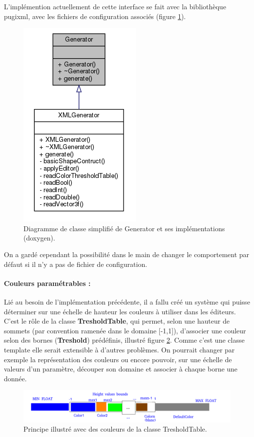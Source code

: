 \documentclass[a4paper]{article}
\begin{document}
L'implémention actuellement de cette interface se fait avec la bibliothèque pugixml, avec les fichiers de configuration associés (figure \ref{archi_generator}).
    \begin{figure}[!ht]
        \begin{center} \includegraphics[width=0.3\linewidth]{img/archi/archi_generator.png}\end{center}
        \caption{\label{archi_generator}Diagramme de classe simplifié de Generator et ses implémentations (doxygen).}
    \end{figure}
    
On a gardé cependant la possibilité dans le main de changer le comportement par défaut si il n'y a pas de fichier de configuration.

\paragraph{Couleurs paramétrables :}

Lié au besoin de l'implémentation précédente, il a fallu créé un système qui puisse déterminer sur une échelle de hauteur les couleurs à utiliser dans les éditeurs. C'est le rôle de la classe \textbf{TresholdTable}, qui permet, selon une hauteur de sommets (par convention ramenée dans le domaine [-1,1]), d'associer une couleur selon des bornes (\textbf{Treshold}) prédéfinis, illustré figure \ref{archi_treshold}. Comme c'est une classe template elle serait extensible à d'autres problèmes. On pourrait changer par exemple la représentation des couleurs ou encore pouvoir, sur une échelle de valeurs d'un paramètre, découper son domaine et associer à chaque borne une donnée.

\begin{figure}[!ht]
        \begin{center} \includegraphics[width=\linewidth]{img/archi/example_treshold.png}\end{center}
        \caption{\label{archi_treshold}Principe illustré avec des couleurs de la classe TresholdTable.}
\end{figure}
\end{document}
